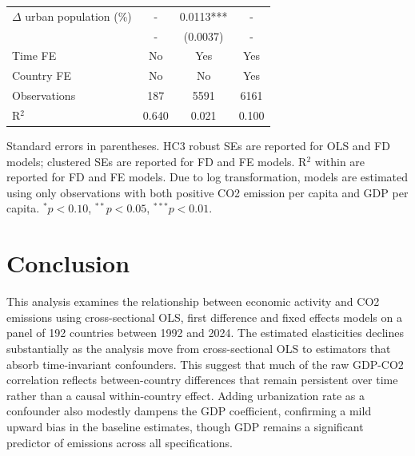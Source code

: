 \documentclass[12pt, a4paper]{article}
\begin{document}
\begin{table}[H]
\begin{threeparttable}
\begin{tabularx}{\textwidth}{Xccc}
$\Delta$ urban population (\%)    & - & 0.0113***   & - \\
                                & - & (0.0037) & - \\[0.3em]
\midrule
Time FE                 & No & Yes & Yes \\
Country FE              & No & No  & Yes \\
Observations            & 187   & 5591   & 6161 \\
R$^2$                   & 0.640 & 0.021 & 0.100 \\
\bottomrule
\end{tabularx}
\begin{tablenotes}
\small
\item Standard errors in parentheses. HC3 robust SEs are reported for OLS and FD models; clustered SEs are reported for FD and FE models. R$^2$ within are reported for FD and FE models. Due to log transformation, models are estimated using only observations with both positive CO2 emission per capita and GDP per capita. $^{*}p<0.10$, $^{**}p<0.05$, $^{***}p<0.01$.
\end{tablenotes}
\end{threeparttable}
\end{table}

\section{Conclusion}

This analysis examines the relationship between economic activity and CO2 emissions using cross-sectional OLS, first difference and fixed effects models on a panel of 192 countries between 1992 and 2024. The estimated elasticities declines substantially as the analysis move from cross-sectional OLS to estimators that absorb time-invariant confounders. This suggest that much of the raw GDP-CO2 correlation reflects between-country differences that remain persistent over time rather than a causal within-country effect. Adding urbanization rate as a confounder also modestly dampens the GDP coefficient, confirming a mild upward bias in the baseline estimates, though GDP remains a significant predictor of emissions across all specifications.

\end{document}
